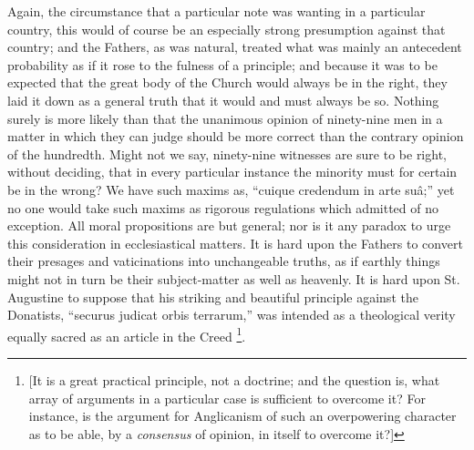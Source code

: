 Again, the circumstance that a particular note
was wanting in a particular country, this would of course be an
especially strong presumption against that country; and the Fathers,
as was natural, treated what was mainly an antecedent probability as
if it rose to the fulness of a principle; and because it was to be
expected that the great body of the Church would always be in the
right, they laid it down as a general truth that it would and must
always be so. Nothing surely is more likely than that the unanimous
opinion of ninety-nine men in a matter in which they can judge should
be more correct than the contrary opinion of the hundredth. Might not
we say, ninety-nine witnesses are sure to be right, without deciding,
that in every particular instance the minority must for certain be in
the wrong? We have such maxims as, ``cuique credendum in arte suâ;''
yet no one would take such maxims as rigorous regulations which
admitted of no exception. All moral propositions are but general; nor
is it any paradox to urge this consideration in ecclesiastical
matters. It is hard upon the Fathers to convert their presages and
vaticinations into unchangeable truths, as if earthly things might not
in turn be their subject-matter as well as heavenly. It is hard upon
St. Augustine to suppose that his striking and beautiful principle
against the Donatists, ``securus judicat orbis terrarum,'' was
intended as a theological verity equally sacred as an article in the
Creed \footnote{[It is a great practical principle, not a
doctrine; and the question is, what array of arguments in a particular
case is sufficient to overcome it? For instance, is the argument for
Anglicanism of such an overpowering character as to be able, by a \emph{consensus}
of opinion, in itself to overcome it?]}.


